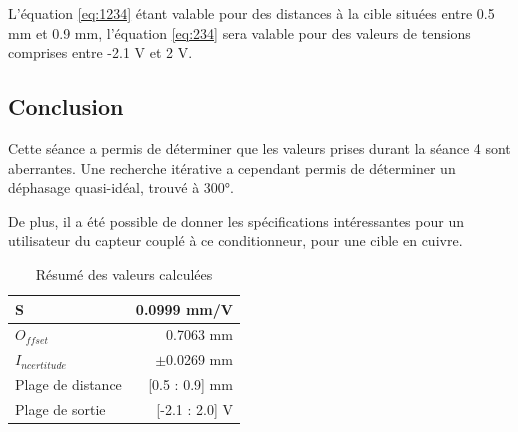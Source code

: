 L'équation \ref{eq:1234} étant valable pour des distances à la cible situées entre 0.5 mm et 0.9 mm,
l'équation \ref{eq:234} sera valable pour des valeurs de tensions comprises entre -2.1 V et 2 V.
\subsection{Conclusion}

Cette séance a permis de déterminer que les valeurs prises durant la séance 4 sont aberrantes.
Une recherche itérative a cependant permis de déterminer un déphasage quasi-idéal, trouvé à 300°.
\vspace{0.2cm}

De plus, il a été possible de donner les spécifications intéressantes pour un utilisateur du capteur
couplé à ce conditionneur, pour une cible en cuivre.

\begin{table}[H]
    \centering
    \begin{tabular}{|l|r|}
    \cline{1-2}
    S   & 0.0999 mm/V   \\ \hline
    $O_{ffset}$   & 0.7063  mm        \\ \hline
    $I_{ncertitude}$ & $\pm$0.0269 mm \\ \hline
    Plage de distance & [0.5 : 0.9] mm \\ \hline
    Plage de sortie & [-2.1 : 2.0] V\\ \hline
    \end{tabular}
    \caption{Résumé des valeurs calculées}
    \label{tab:ResumeValeurs}
\end{table}

